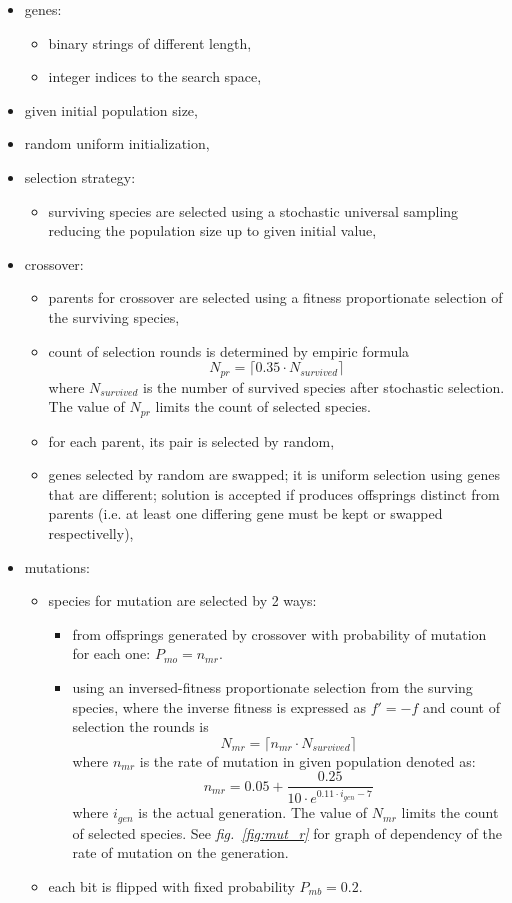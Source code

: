 \documentclass[a4paper]{IEEEtran}
\begin{document}
\begin{itemize}
	\item genes:
	\begin{itemize}
		\item binary strings of different length,
		\item integer indices to the search space,
	\end{itemize}
	\item given initial population size,
	\item random uniform initialization,
	\item selection strategy:
	\begin{itemize}
		\item surviving species are selected using a stochastic universal 
		sampling reducing the population size up to given initial value,
	\end{itemize}
	\item crossover:
	\begin{itemize}
		\item parents for crossover are selected using a fitness proportionate
		selection of the surviving species,
		\item count of selection rounds is determined by empiric formula
		\[ N_{pr} = \lceil 0.35\cdot N_{survived} \rceil \] 		
		where $ N_{survived} $ is the number of survived species after stochastic selection.
		The value of $ N_{pr} $ limits the count of selected species.
		\item for each parent, its pair is selected by random,
		\item genes selected by random are swapped; it is uniform selection using 
		genes that are different; solution is accepted if
		produces  offsprings distinct from parents (i.e. at least one differing gene must be kept or swapped respectivelly),
	\end{itemize}
\end{itemize}
\begin{itemize}
	\item mutations:
	\begin{itemize}
		\item species for mutation are selected by 2 ways:
		\begin{itemize}
			\item from offsprings generated by crossover with probability of mutation for each one:
			$ P_{mo} = n_{mr} $.
			\item using an inversed-fitness proportionate
			selection from the surving species, where the inverse fitness is expressed as
			$ f'=-f  $
			and count of selection the rounds is
			\[ N_{mr} = \lceil n_{mr}\cdot N_{survived} \rceil \]
			where 
			$ n_{mr} $  is the rate of mutation in given population denoted as:			
			\[ n_{mr} = 0.05+\dfrac{0.25}{10\cdot e^{0.11\cdot i_{gen}-7}}\]
			where
			$ i_{gen} $ is the actual generation.
			The value of $ N_{mr} $ limits the count of selected species. 
			See \textit{fig.~\ref{fig:mut_r}} for graph of dependency of the rate of mutation  
			on the generation.
		\end{itemize}
		\item each bit is flipped with fixed probability
		$ P_{mb} = 0.2 $.
	\end{itemize}
\end{itemize}
\end{document}
